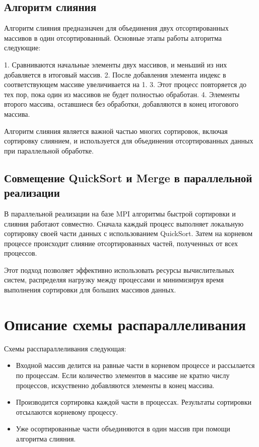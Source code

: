 \documentclass[12pt]{article}
\begin{document}
\subsection{Алгоритм слияния}

Алгоритм слияния предназначен для объединения двух отсортированных массивов в один отсортированный. Основные этапы работы алгоритма следующие:

1. Сравниваются начальные элементы двух массивов, и меньший из них добавляется в итоговый массив.
2. После добавления элемента индекс в соответствующем массиве увеличивается на 1.
3. Этот процесс повторяется до тех пор, пока один из массивов не будет полностью обработан.
4. Элементы второго массива, оставшиеся без обработки, добавляются в конец итогового массива.

Алгоритм слияния является важной частью многих сортировок, включая сортировку слиянием, и используется для объединения отсортированных данных при параллельной обработке.

\subsection{Совмещение QuickSort и Merge в параллельной реализации}

В параллельной реализации на базе MPI алгоритмы быстрой сортировки и слияния работают совместно. Сначала каждый процесс выполняет локальную сортировку своей части данных с использованием QuickSort. Затем на корневом процессе происходит слияние отсортированных частей, полученных от всех процессов. 

Этот подход позволяет эффективно использовать ресурсы вычислительных систем, распределяя нагрузку между процессами и минимизируя время выполнения сортировки для больших массивов данных.


\newpage
\section{Описание схемы распараллеливания}
Схемы расспараллеливания следующая:
\begin{itemize}
    \item Входной массив делится на равные части в корневом процессе и рассылается по процессам. Если количество элементов в массиве не кратно числу процессов, искуственно добавляются элементы в конец массива.
    \item Производится сортировка каждой части в процессах. Результаты сортировки отсылаются корневому процессу.
    \item Уже осортированные части объединяются в один массив при помощи алгоритма слияния.
\end{itemize}
\end{document}
